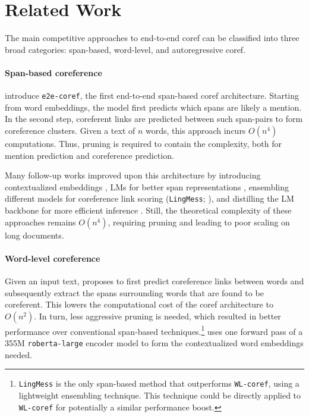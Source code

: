 \documentclass[11pt]{article}
\newcommand\wlcoref{{\texttt{WL-coref}}}
\begin{document}
\section{Related Work}
The main competitive approaches to end-to-end coref can be classified into three broad categories: span-based, word-level, and autoregressive coref. 



\paragraph{Span-based coreference} \citet{lee-etal-2017-end} introduce \texttt{e2e-coref}, the first end-to-end span-based coref architecture. Starting from word embeddings, the model first predicts which spans are likely a mention. In the second step, coreferent links are predicted between such span-pairs to form coreference clusters. Given a text of $n$ words, this approach incurs $O(n^4)$ computations. Thus, pruning is required to contain the complexity, both for mention prediction and coreference prediction. 

Many follow-up works improved upon this architecture by introducing contextualized embeddings \citep{lee-etal-2018-higher, kantor-globerson-2019-coreference}, LMs for better span representations \citep{joshi-etal-2020-spanbert}, 
ensembling different models for coreference link scoring (\texttt{LingMess}; \citealp{otmazgin2023lingmess}), and distilling the LM backbone for more efficient inference \citep{otmazgin-etal-2022-f}. Still, the theoretical complexity of these approaches remains $O(n^4)$, requiring pruning and leading to poor scaling on long documents.

\paragraph{Word-level coreference} Given an input text, \citet{dobrovolskii-2021-word} proposes to first predict coreference links between words and subsequently extract the spans surrounding words that are found to be coreferent. This lowers the computational cost of the coref architecture to $O(n^2)$. In turn, less aggressive pruning is needed, which resulted in better performance over conventional span-based techniques.\footnote{\texttt{LingMess} \citep{otmazgin2023lingmess} is the only span-based method that outperforms \wlcoref{}, using a lightweight ensembling technique. This technique could be directly applied to \wlcoref{} for potentially a similar performance boost.} \citet{dobrovolskii-2021-word} uses one forward pass of a 355M \texttt{roberta-large} encoder model to form the contextualized word embeddings needed.
\end{document}
